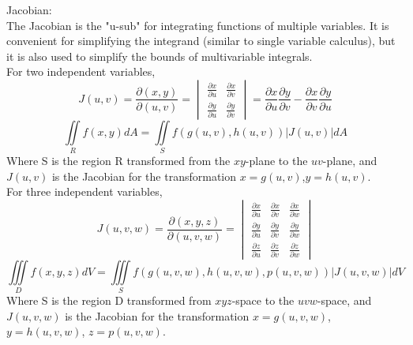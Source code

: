 \documentclass{article}
\begin{document}
Jacobian:
\\The Jacobian is the "u-sub" for integrating functions of multiple variables. It is convenient for simplifying the integrand (similar to single variable calculus), but it is also used to simplify the bounds of multivariable integrals. 
\\For two independent variables,
$$J(u,v) = \frac{\partial (x,y)}{\partial (u,v)}=\begin{vmatrix}
    \frac{\partial x}{\partial u}& \frac{\partial x}{\partial v}  \\
    \frac{\partial y}{\partial u} & \frac{\partial y}{\partial v}  
\end{vmatrix} = \frac{\partial x}{\partial u} \frac{\partial y}{\partial v} - \frac{\partial x}{\partial v} \frac{\partial y}{\partial u} $$
$$\iint\limits_R f(x,y)dA = \iint\limits_S f(g(u,v),h(u,v))|J(u,v)|dA$$
Where S is the region R transformed from the $xy$-plane to the $uv$-plane, and $J(u,v)$ is the Jacobian for the transformation $x=g(u,v)$,$y=h(u,v)$.
\\For three independent variables,
$$J(u,v,w) = \frac{\partial (x,y,z)}{\partial (u,v,w)}=\begin{vmatrix}
    \frac{\partial x}{\partial u}& \frac{\partial x}{\partial v}& \frac{\partial x}{\partial w}  \\
    \frac{\partial y}{\partial u} & \frac{\partial y}{\partial v}& \frac{\partial y}{\partial w} \\
    \frac{\partial z}{\partial u} & \frac{\partial z}{\partial v}& \frac{\partial z}{\partial w}
\end{vmatrix} $$
$$\iiint\limits_D f(x,y,z)dV = \iiint\limits_S f(g(u,v,w),h(u,v,w),p(u,v,w))|J(u,v,w)|dV$$
Where S is the region D transformed from $xyz$-space to the $uvw$-space, and $J(u,v,w)$ is the Jacobian for the transformation $x=g(u,v,w)$, $y=h(u,v,w)$, $z=p(u,v,w)$.
\end{document}
